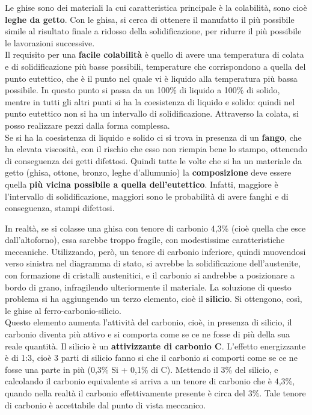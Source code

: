 Le ghise sono dei materiali la cui caratteristica principale è la colabilità, sono cioè \textbf{leghe da getto}. Con le ghisa, si cerca di ottenere il manufatto il più possibile simile al risultato finale a ridosso della solidificazione, per ridurre il più possibile le lavorazioni successive.\\
Il requisito per una \textbf{facile colabilità} è quello di avere una temperatura di colata e di solidificazione più basse possibili, temperature che corrispondono a quella del punto eutettico, che è il punto nel quale vi è liquido alla temperatura più bassa possibile. In questo punto si passa da un 100\% di liquido a 100\% di solido, mentre in tutti gli altri punti si ha la coesistenza di liquido e solido: quindi nel punto eutettico non si ha un intervallo di solidificazione. Attraverso la colata, si posso realizzare pezzi dalla forma complessa.\\
Se si ha la coesistenza di liquido e solido ci si trova in presenza di un \textbf{fango}, che ha elevata viscosità, con il rischio che esso non riempia bene lo stampo, ottenendo di conseguenza dei getti difettosi. Quindi tutte le volte che si ha un materiale da getto (ghisa, ottone, bronzo, leghe d’allumunio) la \textbf{composizione} deve essere quella \textbf{più vicina possibile a quella dell’eutettico}. Infatti, maggiore è l’intervallo di solidificazione, maggiori sono le probabilità di avere fanghi e di conseguenza, stampi difettosi.

In realtà, se si colasse una ghisa con tenore di carbonio 4,3\% (cioè quella che esce dall’altoforno), essa sarebbe troppo fragile, con modestissime caratteristiche meccaniche.
Utilizzando, però, un tenore di carbonio inferiore, quindi muovendosi verso sinistra nel diagramma di stato, si avrebbe la solidificazione dell’austenite, con formazione di cristalli austenitici, e il carbonio si andrebbe a posizionare a bordo di grano, infragilendo ulteriormente il materiale.
La soluzione di questo problema si ha aggiungendo un terzo elemento, cioè il \textbf{silicio}. Si ottengono, così, le ghise al ferro-carbonio-silicio.\\
Questo elemento aumenta l’attività del carbonio, cioè, in presenza di silicio, il carbonio diventa più attivo e si comporta come se ce ne fosse di più della sua reale quantità. Il silicio è un \textbf{attivizzante di carbonio C}. L’effetto energizzante è di 1:3, cioè 3 parti di silicio fanno si che il carbonio si comporti come se ce ne fosse una parte in più (0,3\% Si \mathtext{\to} + 0,1\% di C). Mettendo il 3\% del silicio, e calcolando il carbonio equivalente si arriva a un tenore di carbonio che è 4,3\%, quando nella realtà il carbonio effettivamente presente è circa del 3\%. Tale tenore di carbonio è accettabile dal punto di vista meccanico.

